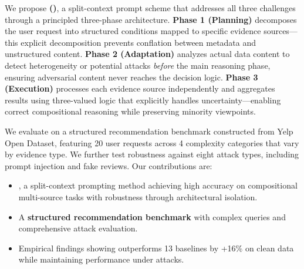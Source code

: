 We propose \textbf{\methodfull (\method)}, a split-context prompt scheme that addresses all three challenges through a principled three-phase architecture.
\textbf{Phase 1 (Planning)} decomposes the user request into structured conditions mapped to specific evidence sources---this explicit decomposition prevents conflation between metadata and unstructured content.
\textbf{Phase 2 (Adaptation)} analyzes actual data content to detect heterogeneity or potential attacks \emph{before} the main reasoning phase, ensuring adversarial content never reaches the decision logic.
\textbf{Phase 3 (Execution)} processes each evidence source independently and aggregates results using three-valued logic that explicitly handles uncertainty---enabling correct compositional reasoning while preserving minority viewpoints.

We evaluate \method on a structured recommendation benchmark constructed from Yelp Open Dataset, featuring 20 user requests across 4 complexity categories that vary by evidence type.
We further test robustness against eight attack types, including prompt injection and fake reviews.
Our contributions are:
\begin{itemize}
    \item \textbf{\method}, a split-context prompting method achieving high accuracy on compositional multi-source tasks with robustness through architectural isolation.
    \item A \textbf{structured recommendation benchmark} with complex queries and comprehensive attack evaluation.
    \item Empirical findings showing \method outperforms 13 baselines by +16\% on clean data while maintaining performance under attacks.
\end{itemize}

